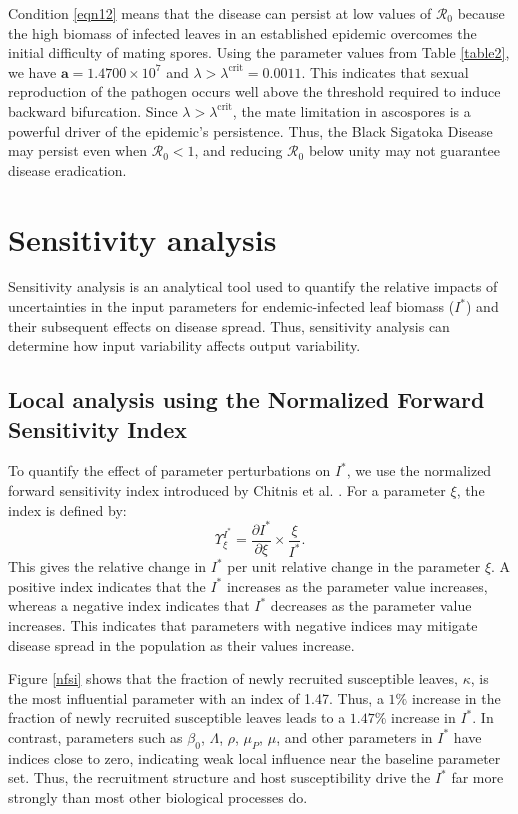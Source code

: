 \documentclass[11pt]{article}
\newcommand\bfa{\mathbf{a}}
\numberwithin{equation}{section}
\begin{document}
    Condition \eqref{eqn12} means that the disease can persist at low values of $\mathcal{R}_0$ because the high biomass of infected leaves in an established epidemic overcomes the initial difficulty of mating spores. Using the parameter values from Table \ref{table2}, we have $\bfa=1.4700\times10^7$ and $\lambda>\lambda^{\text{crit}}=0.0011$. This indicates that sexual reproduction of the pathogen occurs well above the threshold required to induce backward bifurcation. Since $\lambda>\lambda^{\text{crit}}$, the mate limitation in ascospores is a powerful driver of the epidemic's persistence. Thus, the Black Sigatoka Disease may persist even when $\mathcal{R}_0<1$, and reducing $\mathcal{R}_0$ below unity may not guarantee disease eradication.

\section{Sensitivity analysis}\label{sec:sensitivity}
Sensitivity analysis is an analytical tool used to quantify the relative impacts of uncertainties in the input parameters for endemic-infected leaf biomass ($I^*$) and their subsequent effects on disease spread. Thus, sensitivity analysis can determine how input variability affects output variability. 
\subsection{Local analysis using the Normalized Forward Sensitivity Index}
To quantify the effect of parameter perturbations on $I^*$, we use the normalized forward sensitivity index introduced by Chitnis et al. \cite{chitnis}. For a parameter $\xi$, the index is defined by:
\begin{equation}\label{eqn6}
    \Upsilon_{\xi}^{I^*}=\frac{\partial I^*}{\partial\xi}\times\frac{\xi}{I^*}.
\end{equation}
This gives the relative change in $I^*$ per unit relative change in the parameter $\xi$. A positive index indicates that the $I^*$ increases as the parameter value increases, whereas a negative index indicates that $I^*$ decreases as the parameter value increases. This indicates that parameters with negative indices may mitigate disease spread in the population as their values increase.

Figure \ref{nfsi} shows that the fraction of newly recruited susceptible leaves, $\kappa$, is the most influential parameter with an index of 1.47. Thus, a $1\%$ increase in the fraction of newly recruited susceptible leaves leads to a $1.47\%$ increase in $I^*$. In contrast, parameters such as $\beta_0$, $\Lambda$, $\rho$, $\mu_P$, $\mu$, and other parameters in $I^*$ have indices close to zero, indicating weak local influence near the baseline parameter set. Thus, the recruitment structure and host susceptibility drive the $I^*$ far more strongly than most other biological processes do.
\end{document}

